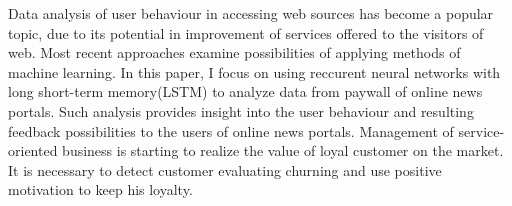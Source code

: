 Data analysis of user behaviour in accessing web sources has become a popular topic, due to its potential in improvement of services offered to the visitors of web. Most recent approaches examine possibilities of applying methods of machine learning.
 In this paper, I focus on using reccurent neural networks with long short-term memory(LSTM) to analyze data from paywall of online news portals. Such analysis provides insight into the user behaviour and resulting feedback possibilities to the users of online news portals. Management of service-oriented business is starting to realize the value of loyal customer on the market. It is necessary to detect customer evaluating churning and use positive motivation to keep his loyalty.
